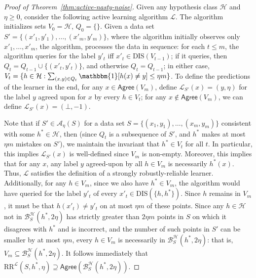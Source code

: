 \documentclass[11pt]{article}
\newcommand{\CR}{\text{RR}}
\newcommand{\0}{\mathbf{0}}
\newcommand{\1}{\mathbf{1}}
\newcommand{\cA}{\mathcal{A}}
\newcommand{\cB}{\mathcal{B}}
\newcommand{\cH}{\mathcal{H}}
\newcommand{\cL}{\mathcal{L}}
\newcommand{\Agree}{\mathsf{Agree}}
\begin{document}
\begin{proof}[Proof of Theorem~\ref{thm:active-nasty-noise}]
Given any hypothesis class $\cH$ and $\eta \geq 0$,
consider the following active learning algorithm $\cL$.
The algorithm initializes sets $V_0 = \cH$, $Q_0 = \{\}$.
Given a data set $S' = \{(x'_1,y'_1),\ldots,(x'_m,y'_m)\}$,
where the algorithm initially observes only $x'_1,\ldots,x'_m$,
the algorithm, processes the data in sequence:
for each $t \leq m$, the algorithm queries for the label
$y'_t$ iff $x'_t \in \text{DIS}(V_{t-1})$;
if it queries, then $Q_t = Q_{t-1} \cup \{(x'_t,y'_t)\}$,
and otherwise $Q_t = Q_{t-1}$;
in either case, $V_t = \{ h \in \cH : \sum_{(x,y) \in Q_t} \mathbbm{1}[h(x) \neq y] \leq \eta m \}$.
To define the predictions of the learner in the end,
for any $x \in \Agree(V_m)$,
define $\cL_{S'}(x) = (y,\eta)$ for the label $y$
agreed upon for $x$ by every $h \in V_t$;
for any $x \notin \Agree(V_m)$, we can define
$\cL_{S'}(x) = (\bot,-1)$.

Note that if $S' \in \cA_\eta(S)$
for a data set $S = \{(x_1,y_1),\ldots,(x_m,y_m)\}$
consistent with some $h^* \in \cH$,
then (since $Q_t$ is a subsequence of $S'$,
and $h^*$ makes at most $\eta m$ mistakes on $S'$),
we maintain the invariant that $h^* \in V_t$ for all $t$.
In particular, this implies $\cL_{S'}(x)$ is well-defined
since $V_m$ is non-empty.  Moreover, this implies that
for any $x$, any label $y$ agreed-upon by all
$h \in V_m$ is necessarily $h^*(x)$.
Thus, $\cL$ satisfies the definition of a strongly
robustly-reliable learner.
Additionally, for any $h \in V_{m}$,
since we also have $h^* \in V_m$,
the algorithm would have queried for the label $y'_t$
of every $x'_t \in \text{DIS}(\{h,h^*\})$.
Since $h$ remains in $V_{m}$, it must be that $h(x'_t) \neq y'_t$
on at most $\eta m$ of these points.
Since any $h \in \cH$ not in $\cB_S^\cH(h^*,2\eta)$
has strictly greater than $2\eta m$ points in $S$
on which it disagrees with $h^*$ and is incorrect,
and the number of such points in $S'$ can be smaller by
at most $\eta m$,
every $h \in V_{m}$ is necessarily in $\cB_S^\cH(h^*,2\eta)$:
that is, $V_{m} \subseteq \cB_S^\cH(h^*,2\eta)$.
It follows immediately that
$\CR^{\cL}(S,h^*,\eta) \supseteq \Agree(\cB_S^\cH(h^*,2\eta))$.


\end{proof}
\end{document}
